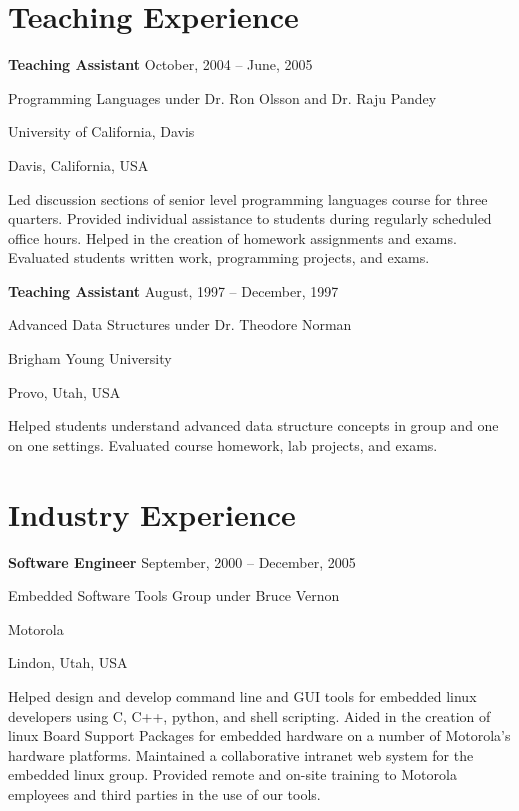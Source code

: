 \documentclass[margin,line,article,letterpaper]{res}
\newenvironment{list1}{
  \begin{list}{}{%
      \setlength{\itemsep}{0in}
      \setlength{\parsep}{0in} \setlength{\parskip}{0in}
      \setlength{\topsep}{0in} \setlength{\partopsep}{0in} 
      \setlength{\leftmargin}{0.17in}}}{\end{list}}
\newcommand{\timespan}[1]{#1}
\begin{document}
\begin{resume}
\section{Teaching Experience}
\textbf{Teaching Assistant} \hfill \timespan{October, 2004 -- June, 2005}\\
\vspace{-10pt}
\begin{list1}
\item Programming Languages under Dr. Ron Olsson and Dr. Raju Pandey
\item University of California, Davis
\item Davis, California, USA
\vspace{6pt}
\item Led discussion sections of senior level programming languages course for three quarters.
Provided individual assistance to students during regularly scheduled office hours. 
Helped in the creation of homework assignments and exams. Evaluated students written 
work, programming projects, and exams. 
\end{list1}

\textbf{Teaching Assistant} \hfill \timespan{August, 1997 -- December, 1997}\\
\vspace{-10pt}
\begin{list1}
\item Advanced Data Structures under Dr. Theodore Norman
\item Brigham Young University
\item Provo, Utah, USA
\vspace{6pt}
\item Helped students understand advanced data structure concepts in group and one on one 
settings. Evaluated course homework, lab projects, and exams. 
\end{list1}



\section{Industry Experience}
\textbf{Software Engineer} \hfill \timespan{September, 2000 -- December, 2005}\\
\vspace{-10pt}
\begin{list1}
\item Embedded Software Tools Group under Bruce Vernon
\item Motorola
\item Lindon, Utah, USA
\vspace{6pt}
\item Helped design and develop command line and GUI tools for embedded linux developers
using C, C++, python, and shell scripting. Aided in the creation of linux Board 
Support Packages for embedded hardware on a number of Motorola's hardware platforms. 
Maintained a collaborative intranet web system for the embedded linux group. 
Provided remote and on-site training to Motorola employees and third parties in the 
use of our tools. 
\end{list1}


\end{resume}
\end{document}
